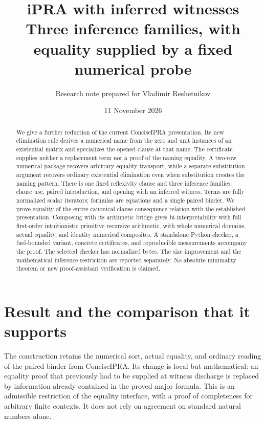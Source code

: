 \documentclass[11pt,a4paper]{article}
\title{\color{ink}iPRA with inferred witnesses\\[6pt]
 \large Three inference families, with equality supplied by a fixed numerical probe}
\author{Research note prepared for Vladimir Reshetnikov}
\date{11 November 2026}
\theoremstyle{definition}\newtheorem{definition}[theorem]{Definition}
\theoremstyle{remark}\newtheorem{remark}[theorem]{Remark}
\begin{document}
\maketitle
\begin{abstract}
We give a further reduction of the current ConciseIPRA presentation. Its
new elimination rule derives a numerical name from the zero and unit
instances of an existential matrix and specializes the opened clause at
that name. The certificate supplies neither a replacement term nor a proof
of the naming equality. A two-row numerical package recovers arbitrary
equality transport, while a separate substitution argument recovers ordinary
existential elimination even when substitution creates the naming pattern.
There is one fixed reflexivity clause and three inference families: clause
use, paired introduction, and opening with an inferred witness. Terms are
fully normalized scalar iterators; formulas are equations and a single
paired binder. We prove equality of the entire canonical clause consequence
relation with the established presentation. Composing with its arithmetic
bridge gives bi-interpretability with full first-order intuitionistic
primitive recursive arithmetic, with whole numerical domains, actual
equality, and identity numerical composites. A standalone Python checker,
a fuel-bounded variant, concrete certificates, and reproducible measurements
accompany the proof. The selected checker has \NewBytes{} normalized bytes.
The size improvement and the mathematical inference restriction are reported
separately. No absolute minimality theorem or new proof-assistant verification
is claimed.
\end{abstract}
\newpage
\tableofcontents
\newpage

\section{Result and the comparison that it supports}
\label{sec:result}

The construction retains the numerical sort, actual equality, and ordinary
reading of the paired binder from ConciseIPRA. Its change is local but
mathematical: an equality proof that previously had to be supplied at
witness discharge is replaced by information already contained in the
proved major formula. This is an admissible restriction of the equality
interface, with a proof of completeness for arbitrary finite contexts.
It does not rely on agreement on standard natural numbers alone.
\end{document}
